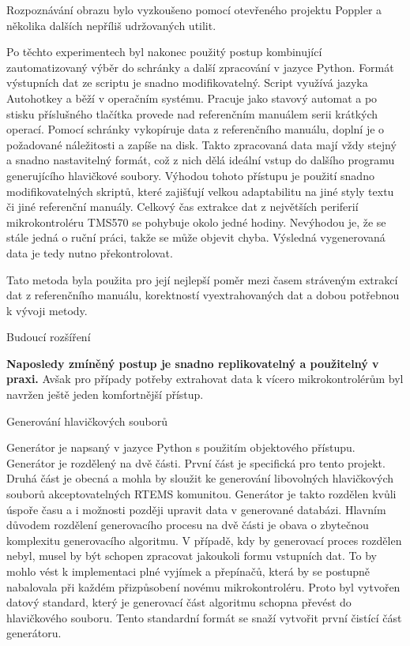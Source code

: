 Rozpoznávání obrazu bylo vyzkoušeno pomocí otevřeného projektu Poppler a několika dalších nepříliš udržovaných utilit.


Po těchto experimentech byl nakonec použitý postup kombinující zautomatizovaný výběr do schránky a další zpracování v jazyce Python.
Formát výstupních dat ze scriptu je snadno modifikovatelný.
Script využívá jazyka Autohotkey a běží v operačním systému.
Pracuje jako stavový automat a po stisku příslušného tlačítka provede nad referenčním manuálem serii krátkých operací.
Pomocí schránky vykopíruje data z referenčního manuálu, doplní je o požadované náležitosti a zapíše na disk.
Takto zpracovaná data mají vždy stejný a snadno nastavitelný formát, což z nich dělá ideální vstup do dalšího programu generujícího hlavičkové soubory.
Výhodou tohoto přístupu je použití snadno modifikovatelných skriptů, které zajišťují velkou adaptabilitu na jiné styly textu či jiné referenční manuály.
Celkový čas extrakce dat z největších periferií mikrokontroléru TMS570 se pohybuje okolo jedné hodiny.
Nevýhodou je, že se stále jedná o ruční práci, takže se může objevit chyba.
Výsledná vygenerovaná data je tedy nutno překontrolovat.

Tato metoda byla použita pro její nejlepší poměr mezi časem stráveným extrakcí dat z referenčního manuálu, korektností vyextrahovaných dat a dobou potřebnou k vývoji metody.

\secc Budoucí rozšíření

	{\bf Naposledy zmíněný postup je snadno replikovatelný a použitelný v praxi. }
Avšak pro případy potřeby extrahovat data k vícero mikrokontrolérům byl navržen ještě jeden komfortnější přístup. %

\sec Generování hlavičkových souborů

	Generátor je napsaný v jazyce Python s použitím objektového přístupu.
Generátor je rozdělený na dvě části.
První část je specifická pro tento projekt.
Druhá část je obecná a mohla by sloužit ke generování libovolných hlavičkových souborů akceptovatelných RTEMS komunitou.
Generátor je takto rozdělen kvůli úspoře času a i možnosti později upravit data v generované databázi.
Hlavním důvodem rozdělení generovacího procesu na dvě části je obava o zbytečnou komplexitu generovacího algoritmu.
V případě, kdy by generovací proces rozdělen nebyl, musel by být schopen zpracovat jakoukoli formu vstupních dat.
To by mohlo vést k implementaci plné vyjímek a přepínačů, která by se postupně nabalovala při každém přizpůsobení novému mikrokontroléru.
Proto byl vytvořen datový standard, který je generovací část algoritmu schopna převést do hlavičkového souboru.
Tento standardní formát se snaží vytvořit první čistící část generátoru.

